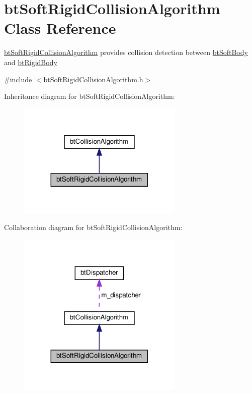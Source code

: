\hypertarget{classbtSoftRigidCollisionAlgorithm}{}\section{bt\+Soft\+Rigid\+Collision\+Algorithm Class Reference}
\label{classbtSoftRigidCollisionAlgorithm}


\hyperlink{classbtSoftRigidCollisionAlgorithm}{bt\+Soft\+Rigid\+Collision\+Algorithm} provides collision detection between \hyperlink{classbtSoftBody}{bt\+Soft\+Body} and \hyperlink{classbtRigidBody}{bt\+Rigid\+Body}  




{\ttfamily \#include $<$bt\+Soft\+Rigid\+Collision\+Algorithm.\+h$>$}



Inheritance diagram for bt\+Soft\+Rigid\+Collision\+Algorithm\+:
\nopagebreak
\begin{figure}[H]
\begin{center}
\leavevmode
\includegraphics[width=224pt]{classbtSoftRigidCollisionAlgorithm__inherit__graph}
\end{center}
\end{figure}


Collaboration diagram for bt\+Soft\+Rigid\+Collision\+Algorithm\+:
\nopagebreak
\begin{figure}[H]
\begin{center}
\leavevmode
\includegraphics[width=224pt]{classbtSoftRigidCollisionAlgorithm__coll__graph}
\end{center}
\end{figure}

